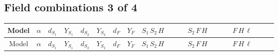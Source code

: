 \documentclass[8pt]{article}
\begin{document}
\begin{landscape}
\begin{longtable}{@{}cccccccc >{\raggedright\arraybackslash}p{0.21\linewidth} >{\raggedright\arraybackslash}p{0.21\linewidth} >{\raggedright\arraybackslash}p{0.21\linewidth}@{}}
\midrule
\bottomrule
\end{longtable}
\clearpage
\subsection*{Field combinations 3 of 4}
\begin{longtable}{@{}cccccccc >{\raggedright\arraybackslash}p{0.21\linewidth} >{\raggedright\arraybackslash}p{0.21\linewidth} >{\raggedright\arraybackslash}p{0.21\linewidth}@{}}
\toprule
Model & $\alpha$ & $d_{S_1}$ & $Y_{S_1}$ & $d_{S_2}$ & $Y_{S_2}$ & $d_F$ & $Y_F$ & $S_1\,S_2\,H$ & $S_2\,F\,H$ & $F\,H\,\ell$ \\
\midrule
\endfirsthead
\toprule
Model & $\alpha$ & $d_{S_1}$ & $Y_{S_1}$ & $d_{S_2}$ & $Y_{S_2}$ & $d_F$ & $Y_F$ & $S_1\,S_2\,H$ & $S_2\,F\,H$ & $F\,H\,\ell$ \\
\midrule
\endhead

\end{longtable}
\end{landscape}
\end{document}
